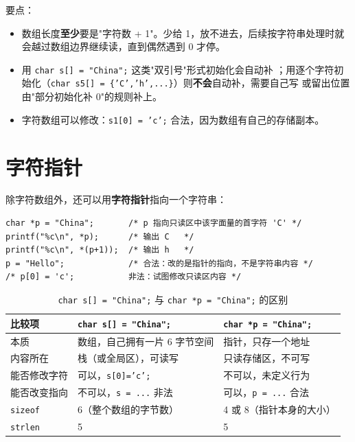 要点：
\begin{itemize}
  \item 数组长度\textbf{至少}要是"字符数 + 1"。少给 1，\nul 放不进去，后续按字符串处理时就会越过数组边界继续读，直到偶然遇到 0 才停。
  \item 用 \texttt{char s[] = "China";} 这类"双引号"形式初始化会自动补 \nul；用逐个字符初始化（\texttt{char s5[] = \{'C','h',...\}}）则\textbf{不会}自动补，需要自己写 \nul 或留出位置由"部分初始化补 0"的规则补上。
  \item 字符数组可以修改：\texttt{s1[0] = 'c';} 合法，因为数组有自己的存储副本。
\end{itemize}

\section{字符指针}
除字符数组外，还可以用\textbf{字符指针}指向一个字符串：
\begin{lstlisting}
char *p = "China";       /* p 指向只读区中该字面量的首字符 'C' */
printf("%c\n", *p);      /* 输出 C   */
printf("%c\n", *(p+1));  /* 输出 h   */
p = "Hello";             /* 合法：改的是指针的指向，不是字符串内容 */
/* p[0] = 'c';           非法：试图修改只读区内容 */
\end{lstlisting}

\begin{table}[htbp]
\centering
\caption{\texttt{char s[] = "China";} 与 \texttt{char *p = "China";} 的区别}
\footnotesize
\begin{tabularx}{\textwidth}{@{}p{2.3cm}p{3.5cm}X@{}}
\toprule
比较项 & \texttt{char s[] = "China";} & \texttt{char *p = "China";} \\
\midrule
本质 & 数组，自己拥有一片 6 字节空间 & 指针，只存一个地址 \\
内容所在 & 栈（或全局区），可读写 & 只读存储区，不可写 \\
能否修改字符 & 可以，\texttt{s[0]='c';} & 不可以，未定义行为 \\
能否改变指向 & 不可以，\texttt{s = ...} 非法 & 可以，\texttt{p = ...} 合法 \\
\texttt{sizeof} & 6（整个数组的字节数） & 4 或 8（指针本身的大小） \\
\texttt{strlen} & 5 & 5 \\
\bottomrule
\end{tabularx}
\end{table}


